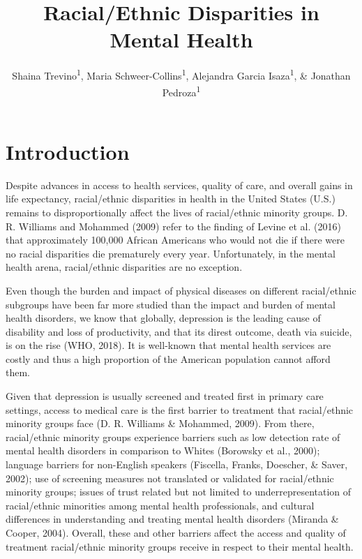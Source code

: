 \documentclass[man]{apa6}
\title{Racial/Ethnic Disparities in Mental Health}
\author{Shaina Trevino\textsuperscript{1}, Maria
Schweer-Collins\textsuperscript{1}, Alejandra Garcia
Isaza\textsuperscript{1}, \& Jonathan Pedroza\textsuperscript{1}}
\date{}
\affiliation{
\vspace{0.5cm}
\textsuperscript{1} University of Oregon}
\begin{document}
\maketitle

\section{Introduction}\label{introduction}

Despite advances in access to health services, quality of care, and
overall gains in life expectancy, racial/ethnic disparities in health in
the United States (U.S.) remains to disproportionally affect the lives
of racial/ethnic minority groups. D. R. Williams and Mohammed (2009)
refer to the finding of Levine et al. (2016) that approximately 100,000
African Americans who would not die if there were no racial disparities
die prematurely every year. Unfortunately, in the mental health arena,
racial/ethnic disparities are no exception.

Even though the burden and impact of physical diseases on different
racial/ethnic subgroups have been far more studied than the impact and
burden of mental health disorders, we know that globally, depression is
the leading cause of disability and loss of productivity, and that its
direst outcome, death via suicide, is on the rise (WHO, 2018). It is
well-known that mental health services are costly and thus a high
proportion of the American population cannot afford them.

Given that depression is usually screened and treated first in primary
care settings, access to medical care is the first barrier to treatment
that racial/ethnic minority groups face (D. R. Williams \& Mohammed,
2009). From there, racial/ethnic minority groups experience barriers
such as low detection rate of mental health disorders in comparison to
Whites (Borowsky et al., 2000); language barriers for non-English
speakers (Fiscella, Franks, Doescher, \& Saver, 2002); use of screening
measures not translated or validated for racial/ethnic minority groups;
issues of trust related but not limited to underrepresentation of
racial/ethnic minorities among mental health professionals, and cultural
differences in understanding and treating mental health disorders
(Miranda \& Cooper, 2004). Overall, these and other barriers affect the
access and quality of treatment racial/ethnic minority groups receive in
respect to their mental health.
\end{document}
